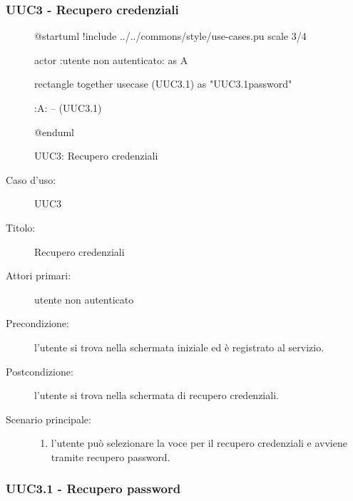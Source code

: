 \documentclass[casi-duso]{subfiles}
\begin{document}
\subsubsection{UUC3 - Recupero credenziali}%
\label{subsub:UUC3utente}

\begin{figure}[h!]
  \centering
  \begin{plantuml}
  @startuml
  !include ../../commons/style/use-cases.pu
  scale 3/4

  actor :utente non autenticato: as A

  rectangle {
    together {
      usecase (UUC3.1) as "UUC3.1\nRecupero password"
    }
  }

  :A: -- (UUC3.1)

  @enduml
  \end{plantuml}
  \caption{UUC3: Recupero credenziali}
  \label{fig:uuc3}
\end{figure}

\begin{description}
  \item[Caso d’uso:] UUC3
  \item[Titolo:] Recupero credenziali
  \item[Attori primari:] utente non autenticato
  \item[Precondizione:] l'utente si trova nella schermata iniziale ed è registrato al servizio.
  \item[Postcondizione:] l'utente si trova nella schermata di recupero credenziali.
  \item[Scenario principale:]
        \begin{enumerate}
          \item l'utente può selezionare la voce per il recupero credenziali e avviene tramite recupero password.
        \end{enumerate}
\end{description}

\subsubsection{UUC3.1 - Recupero password}%
\label{subsub:UUC3.1utente}
\end{document}
